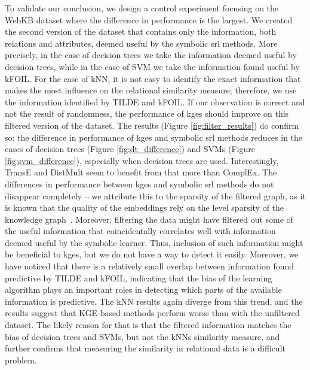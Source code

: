 To validate our conclusion, we design a control experiment focusing on the WebKB dataset where the difference in performance is the largest.
We created the second version of the dataset that contains only the information, both relations and attributes, deemed useful by the symbolic \gls{srl} methods.
More precisely, in the case of decision trees we take the information deemed useful by decision trees, while in the case of SVM we take the information found useful by kFOIL.
For the case of kNN, it is not easy to identify the exact information that makes the most influence on the relational similarity measure; therefore, we use the information identified by TILDE and kFOIL.
If our observation is correct and not the result of randomness, the performance of \gls{kge}s should improve on this filtered version of the dataset.
The results (Figure \ref{fig:filter_results}) do confirm so: the difference in performance of \gls{kge}s and symbolic \gls{srl} methods reduces in the cases of decision trees (Figure \ref{fig:dt_difference}) and SVMs (Figure \ref{fig:svm_difference}), especially when decision trees are used.
Interestingly, TransE and DistMult seem to benefit from that more than ComplEx.
The differences in performance between \gls{kge}s and symbolic \gls{srl} methods do not disappear completely -- we attribute this to the sparsity of the filtered graph, as it is known that the quality of the embeddings rely on the level sparsity of the knowledge graph~\cite{pujara:emnlp17}.
Moreover, filtering the data might have filtered out some of the useful information that coincidentally correlates well with information deemed useful by the symbolic learner.
Thus, inclusion of such information might be beneficial to \gls{kge}s, but we do not have a way to detect it easily.
Moreover, we have noticed that there is a relatively small overlap between information found predictive by TILDE and kFOIL, indicating that the bias of the learning algorithm plays an important roles in detecting which parts of the available information is predictive.
The kNN results again diverge from this trend, and the results suggest that KGE-based methods perform worse than with the unfiltered dataset.
The likely reason for that is that the filtered information matches the bias of decision trees and SVMs, but not the kNNs similarity measure, and further confirms that measuring the similarity in relational data is a difficult problem.



